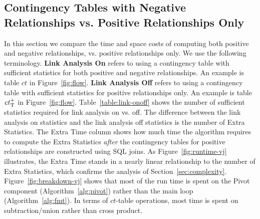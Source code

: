 \documentclass{sig-alternate-2013}
\newcommand{\ct}{\mathit{ct}}
\begin{document}
\subsection{Contingency Tables with Negative Relationships vs. Positive Relationships Only} 
In this section we compare the time and space costs of computing both positive and negative relationships, vs. positive relationships only.
We use the following terminology. \textbf{Link Analysis On} refers to using a contingency table with sufficient statistics for both positive and negative relationships. 
An example is table $\ct$ in Figure~\ref{fig:flow}. 
\textbf{Link Analysis Off} refers to using a contingency table with sufficient statistics for positive relationships only. An example is table $\ct_{\true}^{+}$ %
 in Figure~\ref{fig:flow}. Table~\ref{table:link-onoff} shows the  number of sufficient statistics required for link analysis on vs. off. The difference between the link analysis on statistics  and the link analysis off statistics is the number of Extra Statistics.
The Extra Time column shows how much time the \MJ algorithm requires to compute the Extra Statistics {\em after} the contingency tables for positive relationships are constructed using SQL joins. As Figure~\ref{fig:runtime-vj} illustrates, the Extra Time stands in a nearly linear relationship to the number of Extra Statistics, which confirms the analysis of Section~\ref{sec:complexity}. Figure~\ref{fig:breakdown-vj} shows that most of the \MJ run time is spent on the Pivot component (Algorithm~\ref{alg:pivot}) rather than the main loop (Algorithm~\ref{alg:fmt}). In terms of $\ct$-table operations, most time is spent on subtraction/union rather than cross product.
\end{document}
